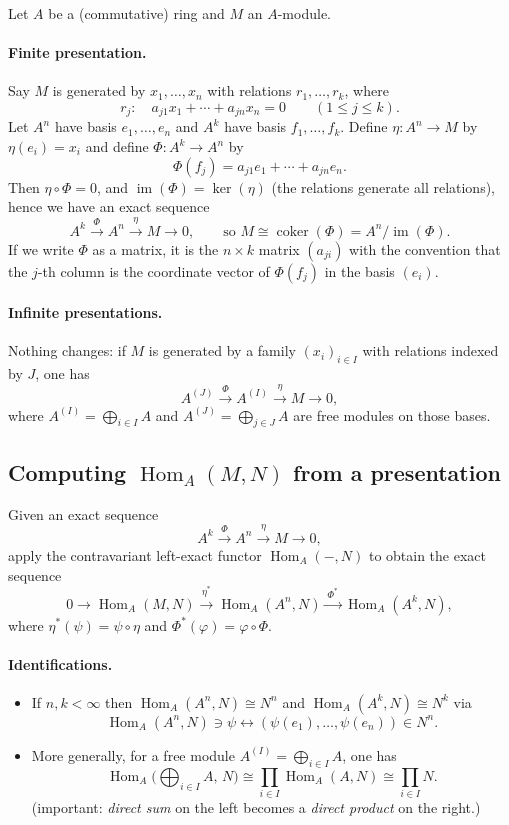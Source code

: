 \documentclass[11pt,a4paper]{article}
\theoremstyle{definition}
\theoremstyle{plain}
\theoremstyle{remark}
\newcommand{\Hom}{\operatorname{Hom}}
\newcommand{\im}{\operatorname{im}}
\newcommand{\coker}{\operatorname{coker}}
\begin{document}
Let $A$ be a (commutative) ring and $M$ an $A$-module.

\paragraph{Finite presentation.}
Say $M$ is generated by $x_1,\dots,x_n$ with relations $r_1,\dots,r_k$, where
\[
r_j:\quad a_{j1}x_1+\cdots+a_{jn}x_n=0 \qquad (1\le j\le k).
\]
Let $A^n$ have basis $e_1,\dots,e_n$ and $A^k$ have basis $f_1,\dots,f_k$.
Define $\eta:A^n\to M$ by $\eta(e_i)=x_i$ and define $\Phi:A^k\to A^n$ by
\[
\Phi(f_j)=a_{j1}e_1+\cdots+a_{jn}e_n.
\]
Then $\eta\circ \Phi=0$, and $\im(\Phi)=\ker(\eta)$ (the relations generate all relations), hence we have an exact sequence
\[
A^k \xrightarrow{\ \Phi\ } A^n \xrightarrow{\ \eta\ } M \to 0,
\qquad\text{so } M \cong \coker(\Phi)=A^n/\im(\Phi).
\]
If we write $\Phi$ as a matrix, it is the $n\times k$ matrix $(a_{ji})$ with the convention that the $j$-th column is the coordinate vector of $\Phi(f_j)$ in the basis $(e_i)$.

\paragraph{Infinite presentations.}
Nothing changes: if $M$ is generated by a family $(x_i)_{i\in I}$ with relations indexed by $J$, one has
\[
A^{(J)} \xrightarrow{\ \Phi\ } A^{(I)} \xrightarrow{\ \eta\ } M \to 0,
\]
where $A^{(I)}=\bigoplus_{i\in I} A$ and $A^{(J)}=\bigoplus_{j\in J} A$ are free modules on those bases.

\subsection*{Computing \texorpdfstring{$\Hom_A(M,N)$}{Hom(M,N)} from a presentation}

Given an exact sequence
\[
A^k \xrightarrow{\ \Phi\ } A^n \xrightarrow{\ \eta\ } M \to 0,
\]
apply the contravariant left-exact functor $\Hom_A(-,N)$ to obtain the exact sequence
\[
0 \to \Hom_A(M,N) \xrightarrow{\ \eta^* \ } \Hom_A(A^n,N) \xrightarrow{\ \Phi^* \ } \Hom_A(A^k,N),
\]
where $\eta^*(\psi)=\psi\circ \eta$ and $\Phi^*(\varphi)=\varphi\circ \Phi$.

\paragraph{Identifications.}
\begin{itemize}
\item If $n,k<\infty$ then $\Hom_A(A^n,N)\cong N^n$ and $\Hom_A(A^k,N)\cong N^k$ via
\[
\Hom_A(A^n,N)\ni \psi \longleftrightarrow (\psi(e_1),\dots,\psi(e_n))\in N^n.
\]
\item More generally, for a free module $A^{(I)}=\bigoplus_{i\in I} A$, one has
\[
\Hom_A\!\Big(\bigoplus_{i\in I} A,\,N\Big)\cong \prod_{i\in I} \Hom_A(A,N)\cong \prod_{i\in I} N.
\]
(important: \emph{direct sum} on the left becomes a \emph{direct product} on the right.)
\end{itemize}
\end{document}
